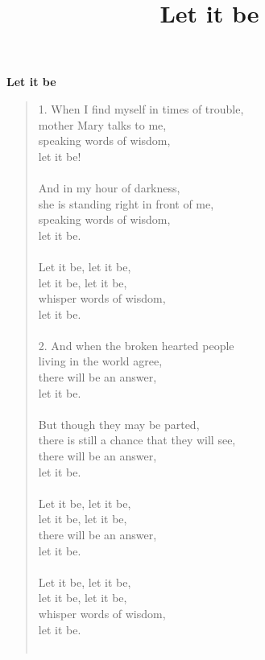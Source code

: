 \documentclass[10pt]{article}
\title{Let it be}
\begin{document}
\twocolumn

\textbf{Let it be}

\begin{verse}
    1. When I find myself in times of trouble, \\
    mother Mary talks to me, \\
    speaking words of wisdom, \\
    let it be! \\
    ~\\
    And in my hour of darkness, \\
    she is standing right in front of me, \\
    speaking words of wisdom, \\
    let it be. \\
    ~\\


    Let it be, let it be, \\
    let it be, let it be, \\
    whisper words of wisdom, \\
    let it be. \\
    ~\\

    2. And when the broken hearted people \\
    living in the world agree, \\
    there will be an answer, \\
    let it be. \\
    ~\\

    But though they may be parted, \\
    there is still a chance that they will see, \\
    there will be an answer, \\
    let it be. \\
    ~\\


    Let it be, let it be, \\
    let it be, let it be, \\
    there will be an answer, \\
    let it be. \\
    ~\\

    Let it be, let it be, \\
    let it be, let it be, \\
    whisper words of wisdom, \\
    let it be. \\
    ~\\



\end{verse}
\end{document}
